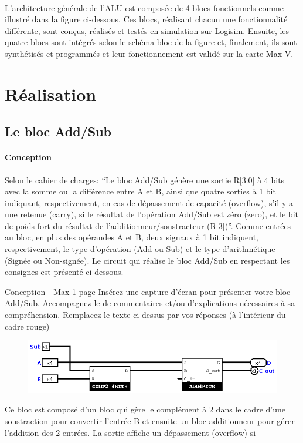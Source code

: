\documentclass[a4paper]{article}
\begin{document}
\paragraph{}
L’architecture générale de l’ALU est composée de 4 blocs fonctionnels comme illustré dans la figure ci-dessous. Ces blocs, réalisant chacun une fonctionnalité différente, sont conçus, réalisés et testés en simulation sur Logisim. Ensuite, les quatre blocs sont intégrés selon le schéma bloc de la figure et, finalement, ils sont synthétisés et programmés et leur fonctionnement est validé sur la carte Max V. 

\section{Réalisation}
\subsection{Le bloc Add/Sub}
\label{add_Sub}

\paragraph{Conception}
Selon le cahier de charges: “Le bloc Add/Sub génère une sortie R[3:0] à 4 bits avec la somme ou la différence entre A et B, ainsi que quatre sorties à 1 bit indiquant, respectivement, en cas de dépassement de capacité (overflow), s’il y a une retenue (carry), si le résultat de l’opération Add/Sub est zéro (zero), et le bit de poids fort du résultat de l’additionneur/soustracteur (R[3])”. Comme entrées au bloc, en plus des opérandes A et B, deux signaux à 1 bit indiquent, respectivement, le type d’opération (Add ou Sub) et le type d’arithmétique (Signée ou Non-signée). Le circuit qui réalise le bloc Add/Sub en respectant les consignes est présenté ci-dessous. 


\begin{tcolorbox}[colframe=Monokaimagenta,colback=white]
Conception - Max 1 page 
Insérez une capture d’écran pour présenter votre bloc Add/Sub.
Accompagnez-le de commentaires et/ou d’explications nécessaires à sa compréhension.
Remplacez le texte ci-dessus par vos réponses (à l’intérieur du cadre rouge)

\begin{figure}[H]
    \centering
    \includegraphics[width=\textwidth]{src/ADDSUB_4BITS.png}
\end{figure}

Ce bloc est composé d'un bloc qui gère le complément à 2 dans le cadre d'une soustraction pour convertir l'entrée B et ensuite un bloc additionneur pour gérer l'addition des 2 entrées.
La sortie affiche un dépassement (overflow) si 

    
\end{tcolorbox}
\end{document}
